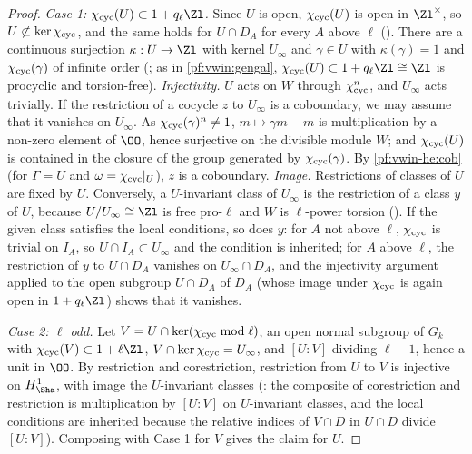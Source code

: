 \begin{proof}
\emph{Case 1: $\vwincyc(U)\subset1+q_\ell\Zl$.} Since $U$ is open, $\chi_{\mathrm{cyc}}(U)$ is open in $\Zl^\times$, so $U\not\subset\ker\chi_{\mathrm{cyc}}$, and the
same holds for $U\cap D_A$ for every $A$ above $\ell$ (). There are a continuous surjection
$\kappa:U\to\Zl$ with kernel $U_\infty$ and $\gamma\in U$ with $\kappa(\gamma)=1$ and $\chi_{\mathrm{cyc}}(\gamma)$ of infinite order
(; as in \cref{pf:vwin:gengal}, $\vwincyc(U)\subset1+q_\ell\Zl\cong\Zl$ is procyclic and torsion-free).
\emph{Injectivity.} $U$ acts on $W$ through $\chi_{\mathrm{cyc}}^n$, and $U_\infty$ acts trivially. If the restriction of a cocycle $z$ to $U_\infty$ is a
coboundary, we may assume that it vanishes on $U_\infty$. As $\chi_{\mathrm{cyc}}(\gamma)^n\ne1$, $m\mapsto\gamma m-m$ is multiplication by a non-zero
element of $\OO$, hence surjective on the divisible module $W$; and $\chi_{\mathrm{cyc}}(U)$ is contained in the closure of the group generated by
$\chi_{\mathrm{cyc}}(\gamma)$. By \cref{pf:vwin-he:cob} (for $\Gamma=U$ and $\omega=\chi_{\mathrm{cyc}}|_U$), $z$ is a coboundary.
\emph{Image.} Restrictions of classes of $U$ are fixed by $U$. Conversely, a $U$-invariant class of $U_\infty$ is the restriction of a class $y$
of $U$, because $U/U_\infty\cong\Zl$ is free pro-$\ell$ and $W$ is $\ell$-power torsion (). If the
given class satisfies the local conditions, so does $y$: for $A$ not above $\ell$, $\chi_{\mathrm{cyc}}$ is trivial on $I_A$, so $U\cap I_A\subset U_\infty$
and the condition is inherited; for $A$ above $\ell$, the restriction of $y$ to $U\cap D_A$ vanishes on $U_\infty\cap D_A$, and the
injectivity argument applied to the open subgroup $U\cap D_A$ of $D_A$ (whose image under $\chi_{\mathrm{cyc}}$ is again open in $1+q_\ell\Zl$) shows
that it vanishes.

\emph{Case 2: $\ell$ odd.} Let $V=U\cap\ker(\chi_{\mathrm{cyc}}\bmod\ell)$, an open normal subgroup of $G_k$ with $\vwincyc(V)\subset1+\ell\Zl$, $V\cap\ker
\chi_{\mathrm{cyc}}=U_\infty$, and $[U:V]$ dividing $\ell-1$, hence a unit in $\OO$. By restriction and corestriction, restriction from $U$ to $V$ is
injective on $H^1_\Sha$, with image the $U$-invariant classes (: the composite of corestriction and
restriction is multiplication by $[U:V]$ on $U$-invariant classes, and the local conditions are inherited because the relative indices of
$V\cap D$ in $U\cap D$ divide $[U:V]$). Composing with Case 1 for $V$ gives the claim for $U$.
\end{proof}

